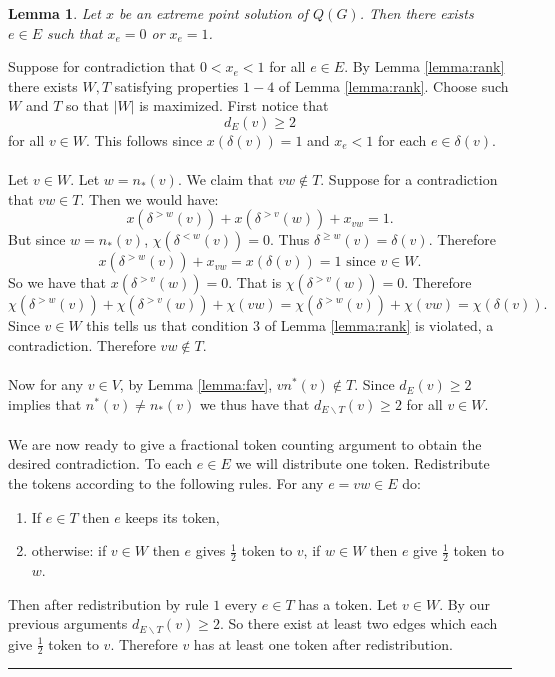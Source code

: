 \documentclass[preprint]{elsarticle}
\newtheorem{lemma}[fact]{Lemma}
\newenvironment{proof}{{\bf Proof:  }}{\hfill\rule{2mm}{2mm}}
\begin{document}
\begin{lemma}
Let $x$ be an extreme point solution of $Q(G)$. Then there exists $e \in E$ such that $x_e = 0$ or $x_e = 1$.
\label{lemma:01}
\end{lemma}
\begin{proof}
Suppose for contradiction that $0 < x_e < 1$ for all $e \in E$. By Lemma \ref{lemma:rank} there exists $W, T$ satisfying properties $1-4$ of Lemma \ref{lemma:rank}. Choose such $W$ and $T$ so that $|W|$ is maximized. First notice that
$$d_E(v) \geq 2 $$
for all $v \in W$. This follows since $x(\delta(v)) = 1$ and $x_e < 1$ for each $e \in \delta(v)$.
\paragraph{}
Let $v \in W$. Let $w = n_*(v)$. We claim that $vw \not\in T$. Suppose for a contradiction that $vw \in T$. Then we would have:
$$  x(\delta^{>w}(v)) + x(\delta^{>v}(w)) + x_{vw} = 1. $$
But since $w=n_*(v)$, $\chi(\delta^{<w}(v)) = 0$. Thus $\delta^{\geq w}(v) = \delta(v)$. Therefore
$$x(\delta^{>w}(v)) + x_{vw} = x(\delta(v)) = 1 \text{ since $v \in W$}. $$
So we have that $ x(\delta^{>v}(w)) = 0 $. That is $\chi(\delta^{>v}(w)) = 0.$
Therefore $$ \chi(\delta^{>w}(v)) + \chi(\delta^{>v}(w)) + \chi(vw) = \chi(\delta^{>w}(v)) + \chi(vw) = \chi(\delta(v)). $$
Since $v \in W$ this tells us that condition $3$ of Lemma \ref{lemma:rank} is violated, a contradiction. Therefore $vw \not\in T$.
\paragraph{}
Now for any $v \in V$, by Lemma \ref{lemma:fav}, $vn^*(v) \not\in T$. Since $d_E(v) \geq 2$ implies that $n^*(v) \neq n_*(v)$ we thus have that $d_{E\backslash T}(v) \geq 2$ for all $v \in W$.
\paragraph{}
We are now ready to give a fractional token counting argument to obtain the desired contradiction. To each $e \in E$ we will distribute one token. Redistribute the tokens according to the following rules. For any $e=vw \in E$ do:
\begin{enumerate}
\item If $e \in T$ then $e$ keeps its token,
\item otherwise:
\subitem if $v \in W$ then $e$ gives $\frac{1}{2}$ token to $v$,
\subitem if $w \in W$ then $e$ give $\frac{1}{2}$ token to $w$.
\end{enumerate}
Then after redistribution by rule $1$ every $e \in T$ has a token. Let $v \in W$. By our previous arguments $d_{E\backslash T}(v) \geq 2$. So there exist at least two edges which each give $\frac{1}{2}$ token to $v$. Therefore $v$ has at least one token after redistribution.

\end{proof}
\end{document}
